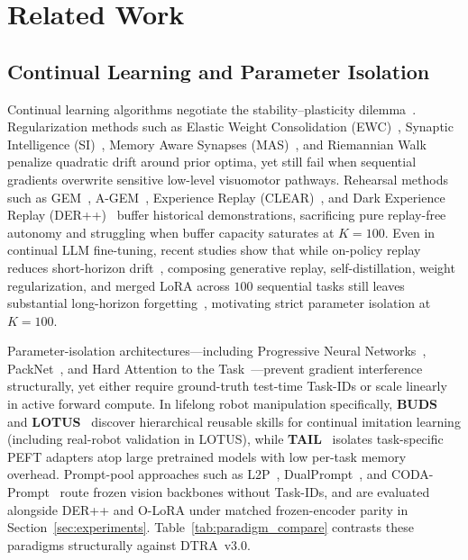 \documentclass[10pt]{article}
\begin{document}
\section{Related Work}
\label{sec:related}

\subsection{Continual Learning and Parameter Isolation}
Continual learning algorithms negotiate the stability--plasticity dilemma~\cite{mccloskey1989catastrophic,french1999catastrophic,parisi2019continual}. Regularization methods such as Elastic Weight Consolidation (EWC)~\cite{kirkpatrick2017ewc}, Synaptic Intelligence (SI)~\cite{zenke2017si}, Memory Aware Synapses (MAS)~\cite{aljundi2018mas}, and Riemannian Walk~\cite{chaudhry2018rwalk} penalize quadratic drift around prior optima, yet still fail when sequential gradients overwrite sensitive low-level visuomotor pathways. Rehearsal methods such as GEM~\cite{lopezpaz2017gem}, A-GEM~\cite{chaudhry2019agem}, Experience Replay (CLEAR)~\cite{rolnick2019clear}, and Dark Experience Replay (DER++)~\cite{buzzega2020der} buffer historical demonstrations, sacrificing pure replay-free autonomy and struggling when buffer capacity saturates at $K=100$. Even in continual LLM fine-tuning, recent studies show that while on-policy replay reduces short-horizon drift~\cite{chen2026opr}, composing generative replay, self-distillation, weight regularization, and merged LoRA across $100$ sequential tasks still leaves substantial long-horizon forgetting~\cite{zhang2026composecl}, motivating strict parameter isolation at $K=100$.

Parameter-isolation architectures---including Progressive Neural Networks~\cite{rusu2016pnn}, PackNet~\cite{mallya2018packnet}, and Hard Attention to the Task~\cite{serra2018hat}---prevent gradient interference structurally, yet either require ground-truth test-time Task-IDs or scale linearly in active forward compute. In lifelong robot manipulation specifically, \textbf{BUDS}~\cite{zhu2022buds} and \textbf{LOTUS}~\cite{wan2024lotus} discover hierarchical reusable skills for continual imitation learning (including real-robot validation in LOTUS), while \textbf{TAIL}~\cite{liu2024tail} isolates task-specific PEFT adapters atop large pretrained models with low per-task memory overhead. Prompt-pool approaches such as L2P~\cite{wang2022l2p}, DualPrompt~\cite{wang2022dualprompt}, and CODA-Prompt~\cite{smith2023coda} route frozen vision backbones without Task-IDs, and are evaluated alongside DER++ and O-LoRA under matched frozen-encoder parity in Section~\ref{sec:experiments}. Table~\ref{tab:paradigm_compare} contrasts these paradigms structurally against DTRA~v3.0.
\end{document}
